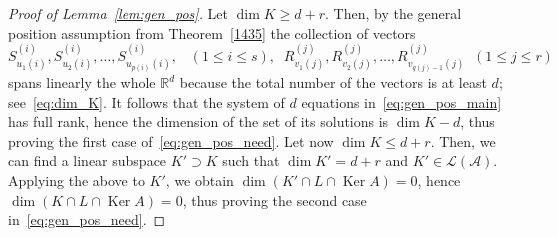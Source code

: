 \documentclass[12pt, reqno]{amsart}
\theoremstyle{plain}
\theoremstyle{definition}
\theoremstyle{remark}
\begin{document}
\begin{proof}[Proof of Lemma~\ref{lem:gen_pos}]
Let $\dim K \geq d+r$. Then, by the general position assumption from Theorem~\ref{1435} the collection of vectors
$$
S^{(i)}_{u_1(i)}, S^{(i)}_{u_2(i)},\ldots, S^{(i)}_{u_{p(i)}(i)}, \;\;\; (1\leq i \leq s),\;\;
R^{(j)}_{v_1(j)}, R^{(j)}_{v_2(j)}, \ldots, R^{(j)}_{v_{q(j)-1}(j)}
\;\; (1\leq j\leq r)
$$
spans linearly the whole ${\mathbb{R}}^d$ because the total number of the vectors is at least $d$; see~\eqref{eq:dim_K}. It follows that the system of $d$ equations in~\eqref{eq:gen_pos_main} has full rank, hence the dimension of the set of its solutions is $\dim K - d$, thus proving the first case of~\eqref{eq:gen_pos_need}.  Let now $\dim K \leq d+r$. Then, we can find a linear subspace $K'\supset K$ such that $\dim K'= d+r$ and $K'\in {\mathcal{L}}({\mathcal{A}})$. Applying the above to $K'$, we obtain $\dim (K'\cap L \cap \operatorname*{Ker} A) = 0$, hence $\dim (K\cap L \cap \operatorname*{Ker} A) = 0$, thus proving the second case in~\eqref{eq:gen_pos_need}.
\end{proof}
\end{document}
